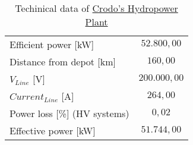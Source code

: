 \begin{table}[h]
\centering
\begin{tabular}{|lc|}
\hline
\rowcolor{bluepoli!40}\multicolumn{2}{|c|}{\textbf{Hydropower Plant - Crodo}}      \\ \hline
\multicolumn{1}{|l|}{Efficient power {[}kW{]}}                      & $52.800,00$  \\ \hline
\multicolumn{1}{|l|}{Distance from depot {[}km{]}}                  & $160,00$     \\ \hline
\multicolumn{1}{|l|}{$V_{Line}$ {[}V{]}}                            & $200.000,00$ \\ \hline
\multicolumn{1}{|l|}{$Current_{Line}$ {[}A{]}}                      & $264,00$     \\ \hline
\multicolumn{1}{|l|}{Power loss {[}\%{]} (HV systems)}              & $0,02$       \\ \hline
\multicolumn{1}{|l|}{Effective power {[}kW{]}}                      & $51.744,00$  \\ \hline
\end{tabular}
\caption{Techinical data of \href{https://goo.gl/maps/dqKiAsYcyXrGMbUd6}{Crodo's Hydropower Plant} }
\label{tab:crodotechspec}
\end{table}
